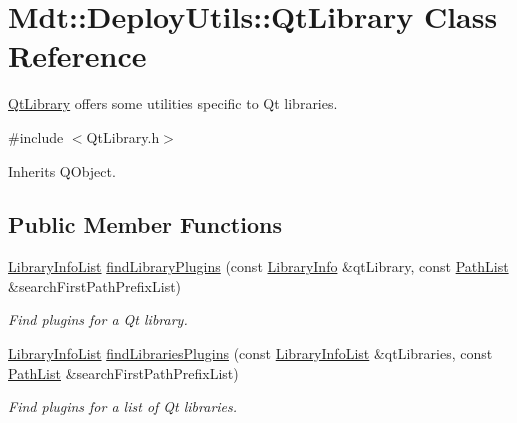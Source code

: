 \hypertarget{class_mdt_1_1_deploy_utils_1_1_qt_library}{}\section{Mdt\+:\+:Deploy\+Utils\+:\+:Qt\+Library Class Reference}
\label{class_mdt_1_1_deploy_utils_1_1_qt_library}


\hyperlink{class_mdt_1_1_deploy_utils_1_1_qt_library}{Qt\+Library} offers some utilities specific to Qt libraries.  




{\ttfamily \#include $<$Qt\+Library.\+h$>$}



Inherits Q\+Object.

\subsection*{Public Member Functions}
\begin{DoxyCompactItemize}
\item 
\hyperlink{class_mdt_1_1_deploy_utils_1_1_library_info_list}{Library\+Info\+List} \hyperlink{class_mdt_1_1_deploy_utils_1_1_qt_library_a4b3c9f30edc9bea8904205eb450e9060}{find\+Library\+Plugins} (const \hyperlink{class_mdt_1_1_deploy_utils_1_1_library_info}{Library\+Info} \&qt\+Library, const \hyperlink{class_mdt_1_1_deploy_utils_1_1_path_list}{Path\+List} \&search\+First\+Path\+Prefix\+List)
\begin{DoxyCompactList}\small\item\em Find plugins for a Qt library. \end{DoxyCompactList}\item 
\hyperlink{class_mdt_1_1_deploy_utils_1_1_library_info_list}{Library\+Info\+List} \hyperlink{class_mdt_1_1_deploy_utils_1_1_qt_library_a268a9e397c091779eb5f961f40c7d3e6}{find\+Libraries\+Plugins} (const \hyperlink{class_mdt_1_1_deploy_utils_1_1_library_info_list}{Library\+Info\+List} \&qt\+Libraries, const \hyperlink{class_mdt_1_1_deploy_utils_1_1_path_list}{Path\+List} \&search\+First\+Path\+Prefix\+List)
\begin{DoxyCompactList}\small\item\em Find plugins for a list of Qt libraries. \end{DoxyCompactList}\end{DoxyCompactItemize}
